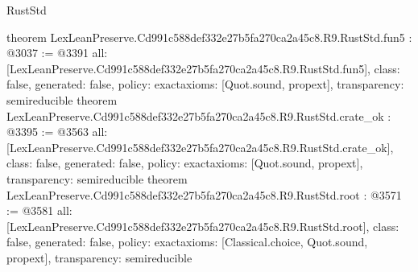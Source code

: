 \begin{lexlean}{RustStd}
\begin{coremodule}
{}
theorem LexLeanPreserve.Cd991c588def332e27b5fa270ca2a45c8.R9.RustStd.fun5 : @3037 := @3391 {
  all: [LexLeanPreserve.Cd991c588def332e27b5fa270ca2a45c8.R9.RustStd.fun5],
  class: false,
  generated: false,
  policy: exact{axioms: [Quot.sound, propext]},
  transparency: semireducible
}
theorem LexLeanPreserve.Cd991c588def332e27b5fa270ca2a45c8.R9.RustStd.crate_ok : @3395 := @3563 {
  all: [LexLeanPreserve.Cd991c588def332e27b5fa270ca2a45c8.R9.RustStd.crate_ok],
  class: false,
  generated: false,
  policy: exact{axioms: [Quot.sound, propext]},
  transparency: semireducible
}
theorem LexLeanPreserve.Cd991c588def332e27b5fa270ca2a45c8.R9.RustStd.root : @3571 := @3581 {
  all: [LexLeanPreserve.Cd991c588def332e27b5fa270ca2a45c8.R9.RustStd.root],
  class: false,
  generated: false,
  policy: exact{axioms: [Classical.choice, Quot.sound, propext]},
  transparency: semireducible
}


\end{coremodule}
\end{lexlean}
